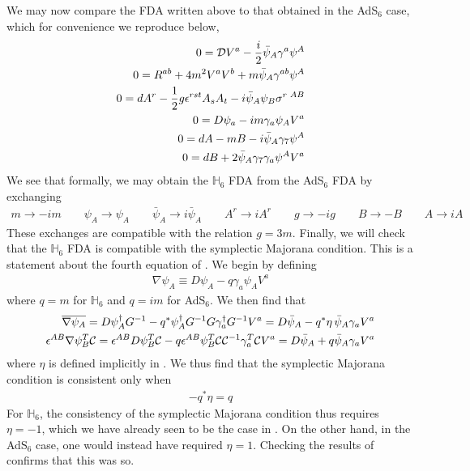 \documentclass[12pt]{article}
\begin{document}
We may now compare the FDA written above to that obtained in the AdS$_6$ case, which for convenience we reproduce below, 
\begin{eqnarray}
0 ={\cal D} V^a - {i \over 2} \bar \psi_A \gamma^a \psi^A 
\nonumber\\
0= R^{ab} + 4 m^2 V^a V^b + m \bar \psi_A \gamma^{a b} \psi^A 
\nonumber\\
0= d A^r - {1\over 2} g \epsilon^{rst} A_s A_t - i \bar \psi_A \psi_B \sigma^{r\,\,AB}
\nonumber\\
0= D \psi_a - i m \gamma_a \psi_A V^a
\nonumber\\
0=dA - m B - i \bar \psi_A \gamma_7 \psi^A 
\nonumber\\
0=d B +2  \bar \psi_A \gamma_7 \gamma_a \psi^A V^a
\end{eqnarray}
We see that formally, we may obtain the $\mathbb{H}_6$ FDA from the AdS$_6$ FDA by exchanging
\begin{align}
m \rightarrow - i m \qquad \psi_A \rightarrow \psi_A \qquad \bar \psi_A \rightarrow i \bar \psi_A \qquad A^r \rightarrow i A^r \qquad g \rightarrow - i g \qquad B \rightarrow - B \qquad A \rightarrow i A\nonumber
\end{align}
These exchanges are compatible with the relation $g = 3m$. 
Finally, we will check that the $\mathbb{H}_6$ FDA is compatible with the symplectic Majorana condition. This is a statement about the fourth equation of . We begin by defining 
\begin{eqnarray}
\nabla \psi_A \equiv D \psi_A - q \gamma_a \psi_A V^a
\end{eqnarray}
where $q = m$ for $\mathbb{H}_6$ and $q=im$ for AdS$_6$. We then find that 
\begin{eqnarray}
\overline{\nabla \psi_A} = D \psi_A^\dagger G^{-1} - q^* \psi_A^\dagger G^{-1} G \gamma_a^\dagger G^{-1} V^a = D \bar \psi_A - q^* \eta \,\bar \psi_A \gamma_a V^a
\nonumber\\
\epsilon^{AB} \nabla \psi_B^T {\cal C} = \epsilon^{AB} D\psi_B^T {\cal C} - q \epsilon^{AB} \psi_B^T {\cal C} {\cal C}^{-1} \gamma_a^T {\cal C} V^a = D \bar \psi_A+q \bar \psi_A \gamma_a V^a
\end{eqnarray}
where $\eta$ is defined implicitly in . We thus find that the symplectic Majorana condition is consistent only when 
\begin{eqnarray}
-q^* \eta = q
\end{eqnarray}
For $\mathbb{H}_6$, the consistency of the symplectic Majorana condition thus requires $\eta=-1$, which we have already seen to be the case in . On the other hand, in the AdS$_6$ case, one would instead have required $\eta=1$. Checking the results of  confirms that this was so. 
\end{document}
